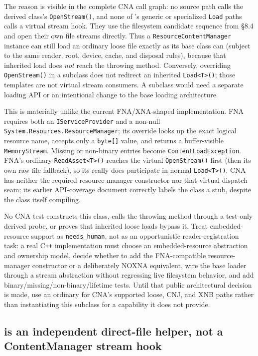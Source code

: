 The reason is visible in the complete CNA call graph: no source path calls the derived class's
\texttt{OpenStream()}, and none of 's generic or specialized
\texttt{Load} paths calls a virtual stream hook. They use the filesystem candidate sequence from
\S8.4 and open their own file streams directly.
Thus a \texttt{ResourceContentManager} instance can still load an ordinary loose file exactly as
its base class can (subject to the same reader, root, device, cache, and disposal rules), because
that inherited load does \emph{not} reach the throwing method. Conversely, overriding
\texttt{OpenStream()} in a subclass does not redirect an inherited \texttt{Load<T>()}; those
templates are not virtual stream consumers. A subclass would need a separate loading API or an
intentional change to the base loading architecture.

This is materially unlike the current FNA/XNA-shaped implementation. FNA requires both an
\texttt{IServiceProvider} and a non-null \texttt{System.Resources.ResourceManager}; its override
looks up the exact logical resource name, accepts only a \texttt{byte[]} value, and returns a
buffer-visible \texttt{MemoryStream}. Missing or non-binary entries become
\texttt{ContentLoadException}. FNA's ordinary \texttt{ReadAsset<T>()} reaches the virtual
\texttt{OpenStream()} first (then its own raw-file fallback), so its
 really does participate in normal \texttt{Load<T>()}. CNA has
neither the required resource-manager constructor nor that virtual dispatch seam; its earlier
API-coverage document correctly labels the class a stub, despite the class itself compiling.

No CNA test constructs this class, calls the throwing method through a test-only derived probe,
or proves that inherited loose loads bypass it. Treat embedded-resource support as
\texttt{needs\_human}, not as an opportunistic reader-registration task: a real C\texttt{++}
implementation must choose an embedded-resource abstraction and ownership model, decide whether
to add the FNA-compatible resource-manager constructor or a deliberately NOXNA equivalent, wire
the base loader through a stream abstraction without regressing live filesystem behavior, and add
binary/missing/non-binary/lifetime tests. Until that public architectural decision is made, use an
ordinary  for CNA's supported loose, CNJ, and XNB paths rather than
instantiating this subclass for a capability it does not provide.

\subsection{ is an independent direct-file helper, not a ContentManager stream hook}
\label{sec:title-container-contract}

